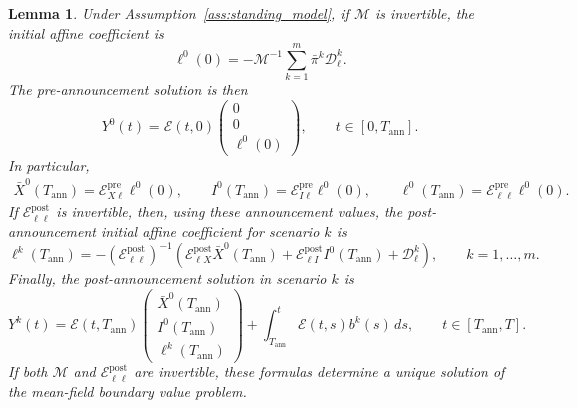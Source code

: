 \documentclass[12pt]{article}
\numberwithin{equation}{section}
\newtheorem{lemma}[theorem]{Lemma}
\theoremstyle{definition}
\begin{document}
\begin{lemma}
\label{lem:mf_state_transition_representation}
Under Assumption~\ref{ass:standing_model}, if \(\mathcal M\) is invertible,
the initial affine coefficient is
\begin{equation}\label{eq:mf_pre_matching}
\ell^0(0)
=
-\mathcal M^{-1}\sum_{k=1}^m\bar\pi^k\mathcal D_\ell^k.
\end{equation}
The pre-announcement solution is then
\begin{equation}\label{eq:mf_pre_forward_solution}
Y^0(t)
=
\mathcal E(t,0)
\begin{pmatrix}
0\\
0\\
\ell^0(0)
\end{pmatrix},
\qquad
t\in[0,T_{\mathrm{ann}}].
\end{equation}
In particular,
\[
\begin{aligned}
\bar X^0(T_{\mathrm{ann}})
=\mathcal E^{\mathrm{pre}}_{X\ell}\ell^0(0),
\qquad
I^0(T_{\mathrm{ann}})
=\mathcal E^{\mathrm{pre}}_{I\ell}\ell^0(0),
\qquad
\ell^0(T_{\mathrm{ann}})
=\mathcal E^{\mathrm{pre}}_{\ell\ell}\ell^0(0).
\end{aligned}
\]
If \(\mathcal E^{\mathrm{post}}_{\ell\ell}\) is invertible, then, using these
announcement values, the post-announcement initial affine coefficient for
scenario \(k\) is
\begin{equation}\label{eq:mf_post_transition_ell}
\ell^k(T_{\mathrm{ann}})
=
-(\mathcal E^{\mathrm{post}}_{\ell\ell})^{-1}
\left(\mathcal E^{\mathrm{post}}_{\ell X}\bar X^0(T_{\mathrm{ann}})+
\mathcal E^{\mathrm{post}}_{\ell I}I^0(T_{\mathrm{ann}})+\mathcal D_\ell^k\right),
\qquad k=1,\ldots,m.
\end{equation}
Finally, the post-announcement solution in scenario \(k\) is
\begin{equation}\label{eq:mf_post_forward_solution}
Y^k(t)
=
\mathcal E(t,T_{\mathrm{ann}})
\begin{pmatrix}
\bar X^0(T_{\mathrm{ann}})\\
I^0(T_{\mathrm{ann}})\\
\ell^k(T_{\mathrm{ann}})
\end{pmatrix}
+
\int_{T_{\mathrm{ann}}}^t
\mathcal E(t,s)b^k(s)\,ds,
\qquad
t\in[T_{\mathrm{ann}},T].
\end{equation}
If both \(\mathcal M\) and \(\mathcal E^{\mathrm{post}}_{\ell\ell}\) are
invertible, these formulas determine a unique solution of the mean-field
boundary value problem.
\end{lemma}
\end{document}

